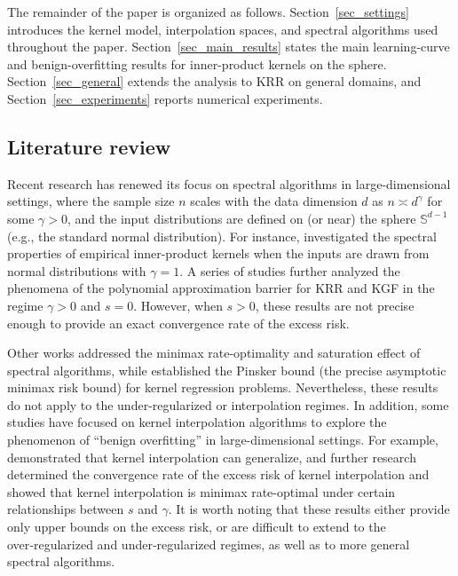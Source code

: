 \documentclass{article}
\theoremstyle{plain}
\theoremstyle{definition}
\theoremstyle{remark}
\begin{document}
The remainder of the paper is organized as follows. Section~\ref{sec_settings} introduces the kernel model, interpolation spaces, and spectral algorithms used throughout the paper. Section~\ref{sec_main_results} states the main learning-curve and benign-overfitting results for inner-product kernels on the sphere. 
Section~\ref{sec_general} extends the analysis to KRR on general domains, and Section~\ref{sec_experiments} reports numerical experiments.


\subsection{ Literature review}
Recent research has renewed its focus on spectral algorithms in large-dimensional settings, where the sample size $n$ scales with the data dimension $d$ as $n \asymp d^{\gamma}$ for some $\gamma > 0$, and the input distributions are defined on (or near) the sphere  $\mathbb{S}^{d-1}$ (e.g., the standard normal distribution).
For instance, \cite{Karoui_spectrum_2010} investigated the spectral properties of empirical inner-product kernels when the inputs are drawn from normal distributions with $\gamma = 1$. 
A series of studies \citep{Liang_Just_2019, liang2020multiple, Ghorbani_When_2021, ghorbani2021linearized, mei2021learning, mei2022generalization, misiakiewicz_learning_2021, aerni2023strong, barzilai2023generalization, Ghosh_three_2021} further analyzed the phenomena of the polynomial approximation barrier for KRR and KGF in the regime $\gamma>0$ and $s=0$. 
However, when \( s > 0 \), these results are not precise enough to provide an exact convergence rate of the excess risk.

Other works \citep{lu2023optimal, zhang2024optimal, lu2024saturation} addressed the minimax rate-optimality and saturation effect of spectral algorithms, while \cite{lu2024pinsker} established the Pinsker bound (the precise asymptotic minimax risk bound) for kernel regression problems. 
Nevertheless, these results do not apply to the under‑regularized or interpolation regimes.
In addition, some studies have focused on kernel interpolation algorithms to explore the phenomenon of ``benign overfitting'' in large-dimensional settings. For example,  \cite{Liang_Just_2019} demonstrated that kernel interpolation can generalize, and further research \citep{liang2020multiple, aerni2023strong, barzilai2023generalization, zhang2024phase} determined the convergence rate of the excess risk of kernel interpolation and showed that kernel interpolation is minimax rate-optimal under certain relationships between $s$ and $\gamma$.
It is worth noting that these results either provide only upper bounds on the excess risk, or are difficult to extend to the over‑regularized and under‑regularized regimes, as well as to more general spectral algorithms.
\end{document}
